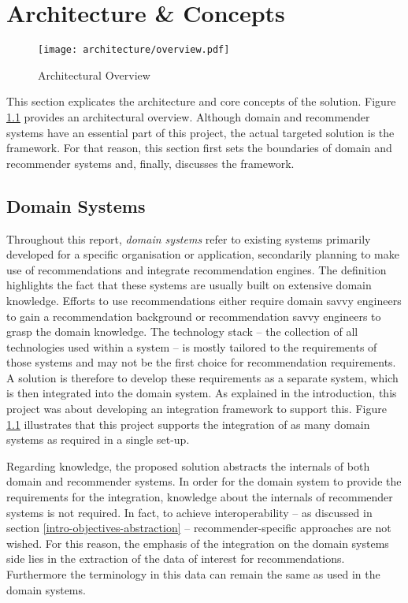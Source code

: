 \chapter{Architecture \& Concepts}

\begin{figure}[ht]
    \texttt{[image: architecture/overview.pdf]}
    \caption{Architectural Overview}
    \label{fig:architecture}
\end{figure}

This section explicates the architecture and core concepts of the solution. Figure \ref{fig:architecture} provides an architectural overview. Although domain and recommender systems have an essential part of this project, the actual targeted solution is the framework. For that reason, this section first sets the boundaries of domain and recommender systems and, finally, discusses the framework.

\section{Domain Systems}
\label{architecture-domain-systems}

Throughout this report, \emph{domain systems} refer to existing systems primarily developed for a specific organisation or application, secondarily planning to make use of recommendations and integrate recommendation engines. The definition highlights the fact that these systems are usually built on extensive domain knowledge. Efforts to use recommendations either require domain savvy engineers to gain a recommendation background or recommendation savvy engineers to grasp the domain knowledge. The technology stack -- the collection of all technologies used within a system -- is mostly tailored to the requirements of those systems and may not be the first choice for recommendation requirements. A solution is therefore to develop these requirements as a separate system, which is then integrated into the domain system. As explained in the introduction, this project was about developing an integration framework to support this. Figure \ref{fig:architecture} illustrates that this project supports the integration of as many domain systems as required in a single set-up.

Regarding knowledge, the proposed solution abstracts the internals of both domain and recommender systems. In order for the domain system to provide the requirements for the integration, knowledge about the internals of recommender systems is not required. In fact, to achieve interoperability -- as discussed in section \ref{intro-objectives-abstraction} -- recommender-specific approaches are not wished. For this reason, the emphasis of the integration on the domain systems side lies in the extraction of the data of interest for recommendations. Furthermore the terminology in this data can remain the same as used in the domain systems.


